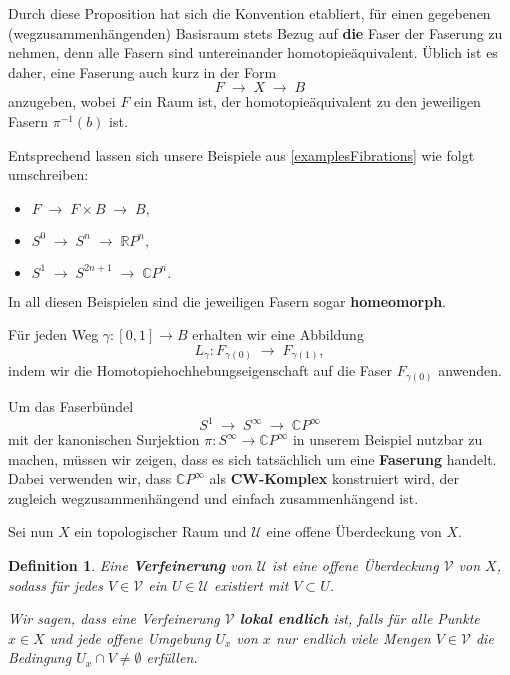 \documentclass[12pt]{article}
\numberwithin{conj}{section}
\newtheorem{definition}[conj]{Definition}
\begin{document}
    \smallskip

    Durch diese Proposition hat sich die Konvention etabliert, für einen gegebenen
    (wegzusammenhängenden) Basisraum stets Bezug auf \textbf{die} Faser der
    Faserung zu nehmen, denn alle Fasern sind untereinander homotopieäquivalent.
    Üblich ist es daher, eine Faserung auch kurz in der Form
    \[
        F \;\longrightarrow\; X \;\longrightarrow\; B
    \]
    anzugeben, wobei $F$ ein Raum ist, der homotopieäquivalent zu den jeweiligen Fasern
    $\pi^{-1}(b)$ ist.

    \smallskip

    Entsprechend lassen sich unsere Beispiele aus \autoref{examplesFibrations} wie
    folgt umschreiben:
    \begin{itemize}[nolistsep]
        \item $F \;\longrightarrow\; F \times B \;\longrightarrow\; B,$

        \item $S^{0} \;\longrightarrow\; S^{n} \;\longrightarrow\; \mathbb{R}P^{n},$

        \item $S^{1} \;\longrightarrow\; S^{2n+1}\;\longrightarrow\; \mathbb{C}P^{n}.$
    \end{itemize}
    In all diesen Beispielen sind die jeweiligen Fasern sogar \textbf{homeomorph}.

    \noindent
    Für jeden Weg $\gamma : [0,1] \to B$ erhalten wir eine Abbildung
    \[
        L_{\gamma} : F_{\gamma(0)}\;\longrightarrow\; F_{\gamma(1)},
    \]
    indem wir die Homotopiehochhebungseigenschaft auf die Faser $F_{\gamma(0)}$
    anwenden.

    \smallskip

    Um das Faserbündel
    \[
        S^{1} \;\longrightarrow\; S^{\infty} \;\longrightarrow\; \mathbb{C}P^{\infty}
    \]
    mit der kanonischen Surjektion $\pi : S^{\infty} \to \mathbb{C}P^{\infty}$ in unserem
    Beispiel nutzbar zu machen, müssen wir zeigen, dass es sich tatsächlich um eine
    \textbf{Faserung} handelt. Dabei verwenden wir, dass $\mathbb{C}P^{\infty}$
    als \textbf{CW-Komplex} konstruiert wird, der zugleich wegzusammenhängend und
    einfach zusammenhängend ist.

    \smallskip

    Sei nun $X$ ein topologischer Raum und $\mathcal{U}$ eine offene Überdeckung von
    $X$.

    \begin{definition}
        Eine \textbf{Verfeinerung} von $\mathcal{U}$ ist eine offene Überdeckung
        $\mathcal{V}$ von $X$, sodass für jedes $V \in \mathcal{V}$ ein $U \in \mathcal{U}$
        existiert mit $V \subset U$.

        Wir sagen, dass eine Verfeinerung $\mathcal{V}$ \textbf{lokal endlich} ist,
        falls für alle Punkte $x \in X$ und jede offene Umgebung $U_{x}$ von $x$ nur
        endlich viele Mengen $V \in \mathcal{V}$ die Bedingung
        $U_{x} \cap V \neq \emptyset$ erfüllen.
    \end{definition}
\end{document}
